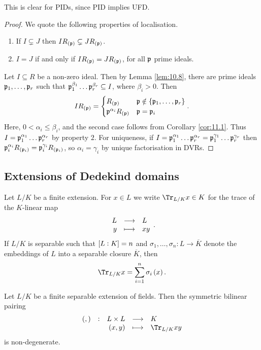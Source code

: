 \begin{remark*}
This is clear for PIDs, since PID implies UFD.
\end{remark*}

\begin{proof}
We quote the following properties of localisation.
\begin{enumerate}
\item If $ I \subsetneq J $ then $ IR_{\br{\ppp}} \subsetneq JR_{\br{\ppp}} $.
\item $ I = J $ if and only if $ IR_{\br{\ppp}} = JR_{\br{\ppp}} $, for all $ \mathfrak{p} $ prime ideals.
\end{enumerate}
Let $ I \subseteq R $ be a non-zero ideal. Then by Lemma \ref{lem:10.8}, there are prime ideals $ \mathfrak{p}_1, \dots, \mathfrak{p}_r $ such that $ \mathfrak{p}_1^{\beta_1} \dots \mathfrak{p}_r^{\beta_r} \subseteq I $, where $ \beta_i > 0 $. Then
$$ IR_{\br{\ppp}} =
\begin{cases}
R_{\br{\ppp}} & \ppp \notin \cbr{\ppp_1, \dots, \ppp_r} \\
\ppp^{\alpha_i}R_{\br{\ppp}} & \ppp = \ppp_i
\end{cases}.
$$
Here, $ 0 < \alpha_i \le \beta_i $, and the second case follows from Corollary \ref{cor:11.1}. Thus $ I = \mathfrak{p}_1^{\alpha_1} \dots \mathfrak{p}_r^{\alpha_r} $ by property $ 2 $. For uniqueness, if $ I = \mathfrak{p}_1^{\alpha_1} \dots \mathfrak{p}_r^{\alpha_r} = \mathfrak{p}_1^{\gamma_1} \dots \mathfrak{p}_r^{\gamma_r} $ then $ \ppp_i^{\alpha_i}R_{\br{\ppp_i}} = \ppp_i^{\gamma_i}R_{\br{\ppp_i}} $, so $ \alpha_i = \gamma_i $ by unique factorisation in DVRs.
\end{proof}

\subsection{Extensions of Dedekind domains}

Let $ L / K $ be a finite extension. For $ x \in L $ we write $ \Tr_{L / K} x \in K $ for the trace of the $ K $-linear map
$$ \function{L}{L}{y}{xy}. $$
If $ L / K $ is separable such that $ \sbr{L : K} = n $ and $ \sigma_1, \dots, \sigma_n : L \to \overline{K} $ denote the embeddings of $ L $ into a separable closure $ \overline{K} $, then
$$ \Tr_{L / K} x = \sum_{i = 1}^n \sigma_i\br{x}. $$

\pagebreak

\begin{lemma}
Let $ L / K $ be a finite separable extension of fields. Then the symmetric bilinear pairing
$$ \function[\br{,}]{L \times L}{K}{\br{x, y}}{\Tr_{L / K} xy} $$
is non-degenerate.
\end{lemma}

